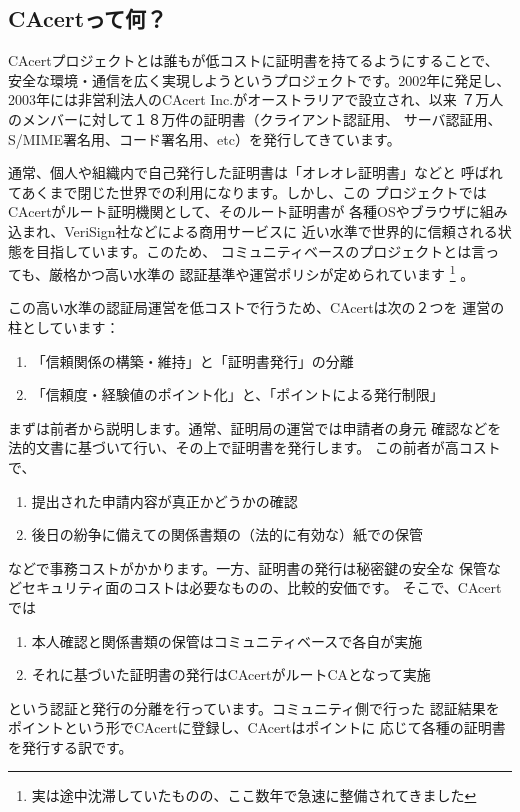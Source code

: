 \documentclass[mingoth,a4paper]{jsarticle}
\begin{document}

\subsection{CAcertって何？}
CAcertプロジェクトとは誰もが低コストに証明書を持てるようにすることで、
安全な環境・通信を広く実現しようというプロジェクトです。2002年に発足し、
2003年には非営利法人のCAcert Inc.がオーストラリアで設立され、以来
７万人のメンバーに対して１８万件の証明書（クライアント認証用、
サーバ認証用、S/MIME署名用、コード署名用、etc）を発行してきています。

通常、個人や組織内で自己発行した証明書は「オレオレ証明書」などと
呼ばれてあくまで閉じた世界での利用になります。しかし、この
プロジェクトではCAcertがルート証明機関として、そのルート証明書が
各種OSやブラウザに組み込まれ、VeriSign社などによる商用サービスに
近い水準で世界的に信頼される状態を目指しています。このため、
コミュニティベースのプロジェクトとは言っても、厳格かつ高い水準の
認証基準や運営ポリシが定められています
\footnote{実は途中沈滞していたものの、ここ数年で急速に整備されてきました}
。

この高い水準の認証局運営を低コストで行うため、CAcertは次の２つを
運営の柱としています：
\begin{enumerate}
\item 「信頼関係の構築・維持」と「証明書発行」の分離
\item 「信頼度・経験値のポイント化」と、「ポイントによる発行制限」
\end{enumerate}

まずは前者から説明します。通常、証明局の運営では申請者の身元
確認などを法的文書に基づいて行い、その上で証明書を発行します。
この前者が高コストで、
\begin{enumerate}
\item 提出された申請内容が真正かどうかの確認
\item 後日の紛争に備えての関係書類の（法的に有効な）紙での保管
\end{enumerate}
などで事務コストがかかります。一方、証明書の発行は秘密鍵の安全な
保管などセキュリティ面のコストは必要なものの、比較的安価です。
そこで、CAcertでは
\begin{enumerate}
\item 本人確認と関係書類の保管はコミュニティベースで各自が実施
\item それに基づいた証明書の発行はCAcertがルートCAとなって実施
\end{enumerate}
という認証と発行の分離を行っています。コミュニティ側で行った
認証結果をポイントという形でCAcertに登録し、CAcertはポイントに
応じて各種の証明書を発行する訳です。
\end{document}
